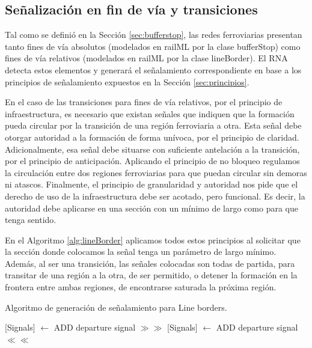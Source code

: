 \subsection{Señalización en fin de vía y transiciones}
    

    Tal como se definió en la Sección \ref{sec:bufferstop}, las redes ferroviarias presentan tanto fines de vía absolutos (modelados en railML por la clase bufferStop) como fines de vía relativos (modelados en railML por la clase lineBorder). El RNA detecta estos elementos y generará el señalamiento correspondiente en base a los principios de señalamiento expuestos en la Sección \ref{sec:principios}.

    En el caso de las transiciones para fines de vía relativos, por el principio de infraestructura, es necesario que existan señales que indiquen que la formación pueda circular por la transición de una región ferroviaria a otra. Esta señal debe otorgar autoridad a la formación de forma unívoca, por el principio de claridad. Adicionalmente, esa señal debe situarse con suficiente antelación a la transición, por el principio de anticipación. Aplicando el principio de no bloqueo regulamos la circulación entre dos regiones ferroviarias para que puedan circular sin demoras ni atascos. Finalmente, el principio de granularidad y autoridad nos pide que el derecho de uso de la infraestructura debe ser acotado, pero funcional. Es decir, la autoridad debe aplicarse en una sección con un mínimo de largo como para que tenga sentido. 

    En el Algoritmo \ref{alg:lineBorder} aplicamos todos estos principios al solicitar que la sección donde colocamos la señal tenga un parámetro de largo mínimo. Además, al ser una transición, las señales colocadas son todas de partida, para transitar de una región a la otra, de ser permitido, o detener la formación en la frontera entre ambas regiones, de encontrarse saturada la próxima región.
    
    \begin{algorithm}[hbt!]
        \caption{Algoritmo de generación de señalamiento para Line borders.}\label{alg:lineBorder}
        \DontPrintSemicolon
        \SetNoFillComment
        \LinesNotNumbered 
        {
            {
                {
                    [Signals] $\gets$ ADD departure signal $\gg\gg$\;
                }
                {
                    [Signals] $\gets$ ADD departure signal $\ll\ll$\;
                }
            }
        }
        \KwResult{[Signals]} 
    \end{algorithm}

